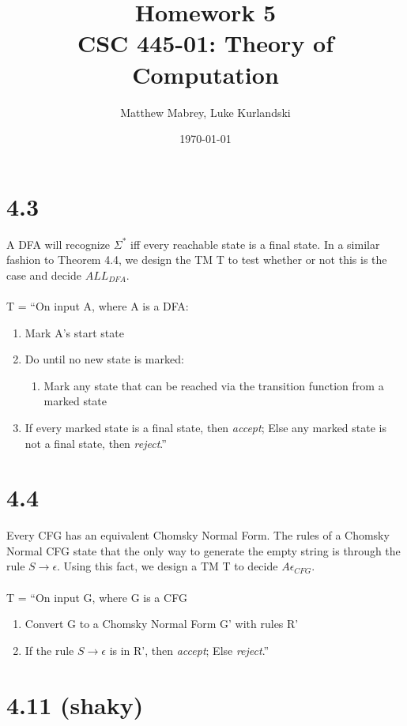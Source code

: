 \documentclass{article}
\title{Homework 5\\[0.2em]\smaller{}CSC 445-01: Theory of Computation}
\author{Matthew Mabrey, Luke Kurlandski}
\date{\today}
\begin{document}
\maketitle

\section*{4.3}

A DFA will recognize $\Sigma^*$ iff every reachable state is a final state. In a similar fashion to Theorem 4.4, we design the TM T to test whether or not this is the case and decide $ALL_{DFA}$.\\\\
T = ``On input A, where A is a DFA:
\begin{enumerate}
    \item Mark A's start state
    \item Do until no new state is marked:
    \begin{enumerate}
        \item Mark any state that can be reached via the transition function from a marked state
    \end{enumerate}
    \item If every marked state is a final state, then \textit{accept}; Else any marked state is not a final state, then \textit{reject}.''
\end{enumerate}

\section*{4.4}

Every CFG has an equivalent Chomsky Normal Form. The rules of a Chomsky Normal CFG state that the only way to generate the empty string is through the rule $S \rightarrow \epsilon$. Using this fact, we design a TM T to decide $A\epsilon_{CFG}$.\\\\
T = ``On input G, where G is a CFG
\begin{enumerate}
    \item Convert G to a Chomsky Normal Form G' with rules R'
    \item If the rule $S\rightarrow \epsilon$ is in R', then \textit{accept}; Else \textit{reject}.''
\end{enumerate}

\section*{4.11 (shaky)}
\end{document}
